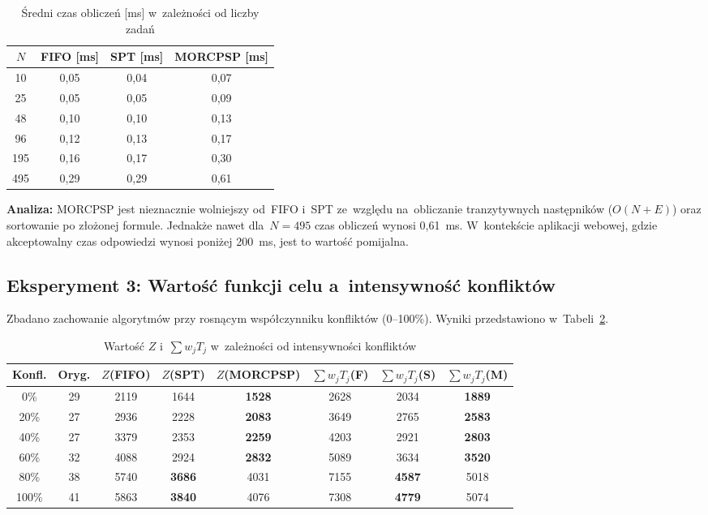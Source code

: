 \begin{table}[H]
\centering
\caption{Średni czas obliczeń [ms] w~zależności od liczby zadań}
\label{tab:exp2_perf}
\begin{tabular}{|c|c|c|c|}
\hline
$N$ & \textbf{FIFO [ms]} & \textbf{SPT [ms]} & \textbf{MORCPSP [ms]} \\ \hline
10 & 0{,}05 & 0{,}04 & 0{,}07 \\ \hline
25 & 0{,}05 & 0{,}05 & 0{,}09 \\ \hline
48 & 0{,}10 & 0{,}10 & 0{,}13 \\ \hline
96 & 0{,}12 & 0{,}13 & 0{,}17 \\ \hline
195 & 0{,}16 & 0{,}17 & 0{,}30 \\ \hline
495 & 0{,}29 & 0{,}29 & 0{,}61 \\ \hline
\end{tabular}
\end{table}

\textbf{Analiza:} MORCPSP jest nieznacznie wolniejszy od~FIFO i~SPT ze~względu na~obliczanie tranzytywnych następników ($O(N + E)$) oraz sortowanie po złożonej formule. Jednakże nawet dla~$N=495$ czas obliczeń wynosi 0{,}61~ms. W~kontekście aplikacji webowej, gdzie akceptowalny czas odpowiedzi wynosi poniżej 200~ms, jest to wartość pomijalna.

\subsection{Eksperyment 3: Wartość funkcji celu a~intensywność konfliktów}
Zbadano zachowanie algorytmów przy rosnącym współczynniku konfliktów (0--100\%). Wyniki przedstawiono w~Tabeli~\ref{tab:exp3_objective}.

\begin{table}[H]
\centering
\caption{Wartość $Z$ i~$\sum w_j T_j$ w~zależności od intensywności konfliktów}
\label{tab:exp3_objective}
\begin{tabular}{|c|c|c|c|c|c|c|c|}
\hline
\textbf{Konfl.} & \textbf{Oryg.} & $Z$\textbf{(FIFO)} & $Z$\textbf{(SPT)} & $Z$\textbf{(MORCPSP)} & $\sum w_jT_j$\textbf{(F)} & $\sum w_jT_j$\textbf{(S)} & $\sum w_jT_j$\textbf{(M)} \\ \hline
0\% & 29 & 2119 & 1644 & \textbf{1528} & 2628 & 2034 & \textbf{1889} \\ \hline
20\% & 27 & 2936 & 2228 & \textbf{2083} & 3649 & 2765 & \textbf{2583} \\ \hline
40\% & 27 & 3379 & 2353 & \textbf{2259} & 4203 & 2921 & \textbf{2803} \\ \hline
60\% & 32 & 4088 & 2924 & \textbf{2832} & 5089 & 3634 & \textbf{3520} \\ \hline
80\% & 38 & 5740 & \textbf{3686} & 4031 & 7155 & \textbf{4587} & 5018 \\ \hline
100\% & 41 & 5863 & \textbf{3840} & 4076 & 7308 & \textbf{4779} & 5074 \\ \hline
\end{tabular}
\end{table}

